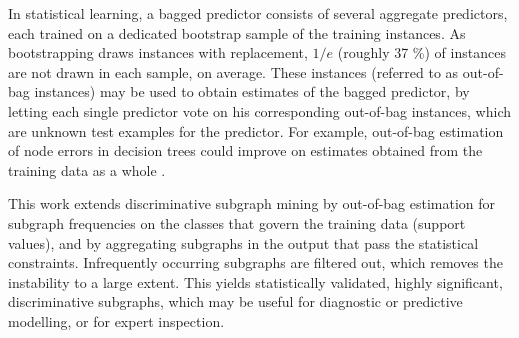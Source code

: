 \documentclass{sig-alternate}
\begin{document}

In statistical learning, a bagged predictor consists of several aggregate
predictors, each trained on a dedicated bootstrap sample of the training
instances. As bootstrapping draws instances with replacement, $1/e$ (roughly 37
\%) of instances are not drawn in each sample, on average.  These instances
(referred to as out-of-bag instances) may be used to obtain estimates of the
bagged predictor, by letting each single predictor vote on his corresponding out-of-bag instances, 
which are unknown test examples for the predictor.
For example, out-of-bag estimation of node errors in
decision trees could improve on estimates obtained from the training data as a
whole \cite{breiman96oob}.

This work extends discriminative subgraph mining by out-of-bag estimation for
subgraph frequencies on the classes that govern the
training data (support values), and by aggregating subgraphs in the output that pass the
statistical constraints.  Infrequently occurring subgraphs are filtered out, 
which removes the instability to a large extent. This yields statistically validated, highly significant,
discriminative subgraphs, which may be useful for diagnostic or predictive
modelling, or for expert inspection. 
\end{document}
